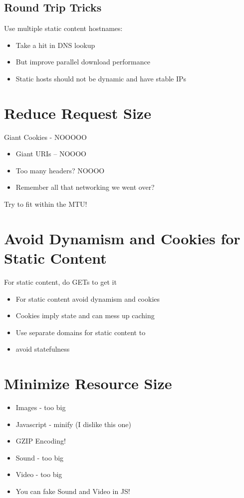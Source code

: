 \documentclass[../CMPUT-404-Notes.tex]{subfiles}
\begin{document}
\subsection{Round Trip Tricks}
Use multiple static content hostnames:
\begin{itemize}
    \item Take a hit in DNS lookup
    \item But improve parallel download performance
    \item Static hosts should not be dynamic and have stable IPs
\end{itemize}

\section{Reduce Request Size}
Giant Cookies - NOOOOO
\begin{itemize}
    \item Giant URIs -- NOOOO
    \item Too many headers? NOOOO
    \item Remember all that networking we went over?
\end{itemize}
Try to fit within the MTU!


\section{Avoid Dynamism and Cookies for Static Content}
For static content, do GETs to get it
\begin{itemize}
    \item For static content avoid dynamism and cookies
    \item Cookies imply state and can mess up caching
    \item Use separate domains for static content to
    \item avoid statefulness
\end{itemize}

\section{Minimize Resource Size}
\begin{itemize}
    \item Images - too big
    \item Javascript - minify (I dislike this one)
    \item GZIP Encoding!
    \item Sound - too big
    \item Video - too big
    \item You can fake Sound and Video in JS!
\end{itemize}
\end{document}
